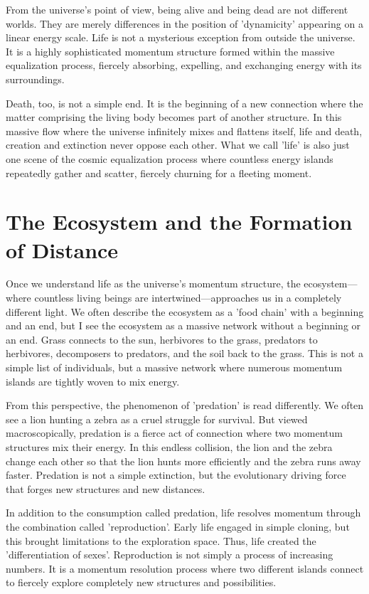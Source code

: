 \documentclass[11pt,a4paper]{article}
\begin{document}
From the universe's point of view, being alive and being dead are not different worlds. They are merely differences in the position of 'dynamicity' appearing on a linear energy scale. Life is not a mysterious exception from outside the universe. It is a highly sophisticated momentum structure formed within the massive equalization process, fiercely absorbing, expelling, and exchanging energy with its surroundings.

Death, too, is not a simple end. It is the beginning of a new connection where the matter comprising the living body becomes part of another structure. In this massive flow where the universe infinitely mixes and flattens itself, life and death, creation and extinction never oppose each other. What we call 'life' is also just one scene of the cosmic equalization process where countless energy islands repeatedly gather and scatter, fiercely churning for a fleeting moment.

\section*{The Ecosystem and the Formation of Distance}
Once we understand life as the universe's momentum structure, the ecosystem—where countless living beings are intertwined—approaches us in a completely different light. We often describe the ecosystem as a 'food chain' with a beginning and an end, but I see the ecosystem as a massive network without a beginning or an end. Grass connects to the sun, herbivores to the grass, predators to herbivores, decomposers to predators, and the soil back to the grass. This is not a simple list of individuals, but a massive network where numerous momentum islands are tightly woven to mix energy.

From this perspective, the phenomenon of 'predation' is read differently. We often see a lion hunting a zebra as a cruel struggle for survival. But viewed macroscopically, predation is a fierce act of connection where two momentum structures mix their energy. In this endless collision, the lion and the zebra change each other so that the lion hunts more efficiently and the zebra runs away faster. Predation is not a simple extinction, but the evolutionary driving force that forges new structures and new distances.

In addition to the consumption called predation, life resolves momentum through the combination called 'reproduction'. Early life engaged in simple cloning, but this brought limitations to the exploration space. Thus, life created the 'differentiation of sexes'. Reproduction is not simply a process of increasing numbers. It is a momentum resolution process where two different islands connect to fiercely explore completely new structures and possibilities.
\end{document}
